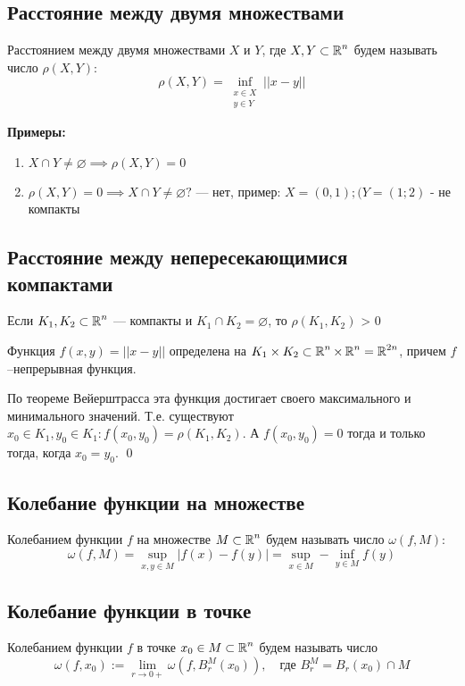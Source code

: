 \documentclass[a4paper, 10pt]{article}
\begin{document}
\subsection{Расстояние между двумя множествами}
 Расстоянием между двумя множествами $X$ и $Y$, где $X, Y \subset \operatorname{\mathbb{R}}^n$ будем называть число $\rho(X, Y)$:
\begin{equation*}
    \rho(X, Y) = \inf_{\substack{x\in X\\y\in{Y}}} ||x-y||
\end{equation*}

\textbf{Примеры:}\\
\begin{enumerate}
    \item $X\cap Y \ne \varnothing \implies \rho(X, Y) = 0$
    \item $\rho(X, Y) =0 \implies X \cap Y \ne \varnothing?$ --- нет, пример: $X = (0, 1); (Y = (1; 2)$ - не компакты
\end{enumerate}

\subsection{Расстояние между непересекающимися компактами}
\theorem Если $K_1, K_2 \subset \operatorname{\mathbb{R}}^n$ — компакты и $K_1 \cap K_2 = \varnothing$, то $\rho(K_1, K_2)$ > 0

\proof Функция $f(x,y)=||x-y||$ определена на $K_1\times K_2 \subset \operatorname{\mathbb{R}}^n\times\operatorname{\mathbb{R}}^n = \operatorname{\mathbb{R}}^{2n}$, причем $f$–непрерывная функция.

По теореме Вейерштрасса эта функция достигает своего максимального и минимального значений. Т.е. существуют $x_0 \in K_1, y_0 \in K_1: f(x_0, y_0) = \rho(K_1, K_2)$. А $f(x_0,y_0) = 0$ тогда и только тогда, когда $x_0 = y_0$. \qed

\subsection{Колебание функции на множестве}
 Колебанием функции $f$ на множестве $M\subset \operatorname{\mathbb{R}}^n$ будем называть число $\omega(f, M)$:
\begin{equation*}
    \omega(f, M) = \sup_{x, y\in M}|f(x) - f(y)| = \sup_{x\in M} - \inf_{y\in M} f(y)
\end{equation*}

\subsection{Колебание функции в точке}
 Колебанием функции $f$ в точке $x_0 \in M \subset\operatorname{\mathbb{R}}^n$ будем называть число
\begin{equation*}
    \omega(f, x_0):= \lim_{r \to 0+} \omega(f, B_r^M(x_0)), \quad \text{где } B_r^M = B_r(x_0)\cap M
\end{equation*}
\end{document}
